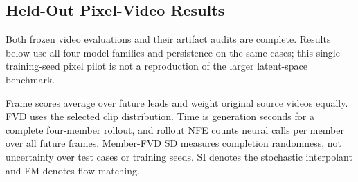 \subsection{Held-Out Pixel-Video Results}\label{app:video-results}

Both frozen video evaluations and their artifact audits are complete. Results below use all four model families and persistence on the same cases; this single-training-seed pixel pilot is not a reproduction of the larger latent-space benchmark.

Frame scores average over future leads and weight original source videos equally. FVD uses the selected clip distribution. Time is generation seconds for a complete four-member rollout, and rollout NFE counts neural calls per member over all future frames. Member-FVD SD measures completion randomness, not uncertainty over test cases or training seeds. SI denotes the stochastic interpolant and FM denotes flow matching.

\begin{table}[t]\centering\small



\caption{CLEVRER: matched pilot distributional quality and generation cost. Pooled FVD uses 128 real and 512 generated clips; member FVD uses 4 separate 128-versus-128 comparisons. Lower CRPS and FVD are better. Persistence has zero neural evaluations.}\label{tab:video-clevrer-quality}

\end{table}

\begin{table}[t]\centering\small



\caption{CLEVRER: future image quality, averaged across leads. Sample metrics average over completions. Mean PSNR/SSIM score the ensemble-mean image. Image/perceptual metrics use clipped copies; neither feedback nor proper scores are clipped.}\label{tab:video-clevrer-images}

\end{table}

\begin{table}[t]\centering\small



\caption{CLEVRER: additional future-only proper-score and calibration diagnostics. Spread/skill includes the finite-ensemble correction; 90\% denotes the empirical central interval from four members and is not expected to attain 90\% even under ideal calibration. Out-of-range values are measured before display clipping.}\label{tab:video-clevrer-calibration}

\end{table}

